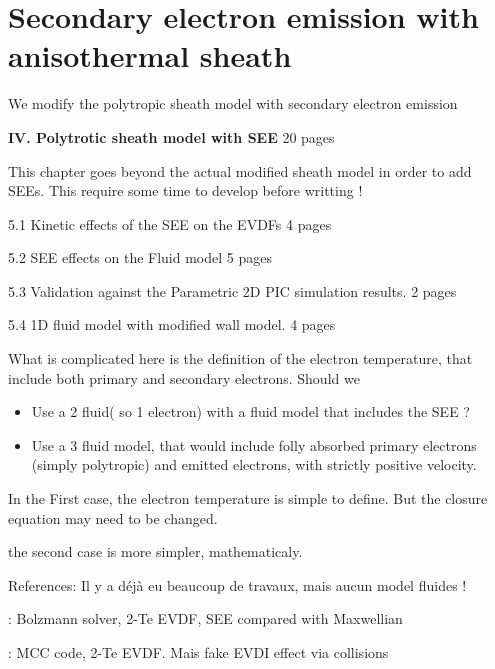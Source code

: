 



\chapter{Secondary electron emission with anisothermal sheath}
\label{ch-5}

\begin{Chabstract}
  
We modify the polytropic sheath model with secondary electron emission
\end{Chabstract}

{\bf IV. Polytrotic sheath model with SEE} 20 pages
\begin{zzz}
  This chapter goes beyond the actual modified sheath model in order to add SEEs.
  This require some time to develop before writting !

  5.1 Kinetic effects of the SEE on the EVDFs  4 pages

  5.2 SEE effects on the Fluid model  5 pages

  5.3 Validation against the Parametric 2D PIC simulation results. 2 pages
  
  5.4 1D fluid model with modified wall model. 4 pages
\end{zzz}

\minitoc

What is complicated here is the definition of the electron temperature, that include both primary and secondary electrons.
Should we
\begin{itemize}
  \item Use a 2 fluid( so 1 electron) with a fluid model that includes the SEE ?
  \item Use a 3 fluid model, that would  include folly absorbed primary electrons (simply polytropic) and emitted electrons, with strictly positive velocity.
\end{itemize}

In the First case, the electron temperature is simple to define.
But the closure equation may need to be changed.

the second case is more simpler, mathematicaly.

References:
Il y a déjà eu beaucoup de travaux, mais aucun model fluides !

\citet{meezan2002} : Bolzmann solver, 2-Te EVDF, SEE compared with Maxwellian

\citet{smirnov2004} : MCC code, 2-Te EVDF. Mais fake EVDI effect via collisions

